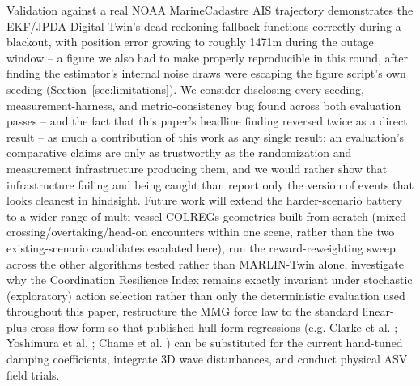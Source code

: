 \documentclass[journal,twocolumn,10pt]{IEEEtran}
\begin{document}
Validation against a real NOAA MarineCadastre AIS trajectory demonstrates the EKF/JPDA Digital Twin's dead-reckoning fallback functions correctly during a blackout, with position error growing to roughly 1471m during the outage window -- a figure we also had to make properly reproducible in this round, after finding the estimator's internal noise draws were escaping the figure script's own seeding (Section~\ref{sec:limitations}). We consider disclosing every seeding, measurement-harness, and metric-consistency bug found across both evaluation passes -- and the fact that this paper's headline finding reversed twice as a direct result -- as much a contribution of this work as any single result: an evaluation's comparative claims are only as trustworthy as the randomization and measurement infrastructure producing them, and we would rather show that infrastructure failing and being caught than report only the version of events that looks cleanest in hindsight. Future work will extend the harder-scenario battery to a wider range of multi-vessel COLREGs geometries built from scratch (mixed crossing/overtaking/head-on encounters within one scene, rather than the two existing-scenario candidates escalated here), run the reward-reweighting sweep across the other algorithms tested rather than MARLIN-Twin alone, investigate why the Coordination Resilience Index remains exactly invariant under stochastic (exploratory) action selection rather than only the deterministic evaluation used throughout this paper, restructure the MMG force law to the standard linear-plus-cross-flow form so that published hull-form regressions (e.g. Clarke et al. \cite{clarke1983manoeuvring}; Yoshimura et al. \cite{wang2024mmg}; Chame et al. \cite{chame2025linearderivative}) can be substituted for the current hand-tuned damping coefficients, integrate 3D wave disturbances, and conduct physical ASV field trials.



\end{document}
